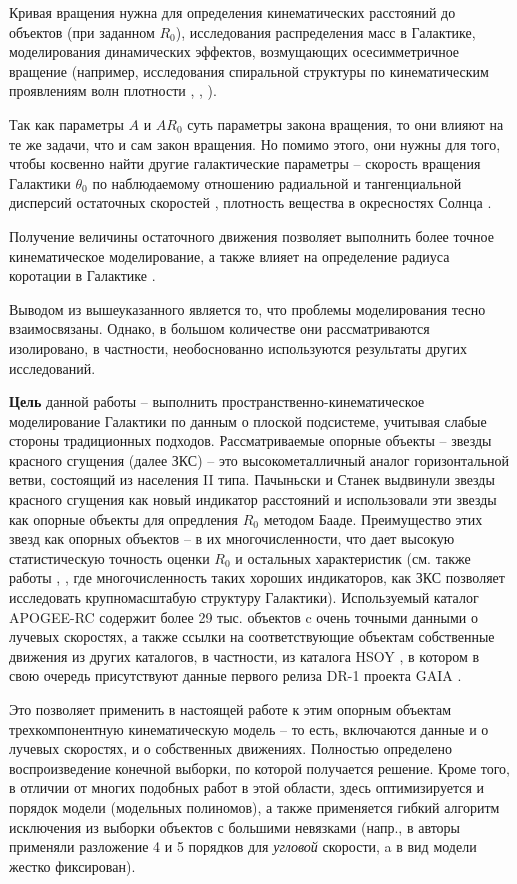 \documentclass{matmex-diploma-custom}
\begin{document}
\par Кривая вращения нужна для определения кинематических расстояний до объектов (при заданном $R_0$), исследования распределения масс в Галактике, моделирования динамических эффектов, возмущающих осесимметричное вращение (например, исследования спиральной структуры по кинематическим проявлениям волн плотности \cite{Sitnik}, \cite{Mishurov}, \cite{NIISch}).
\par Так как параметры $A$ и $AR_0$ суть параметры закона вращения, то они влияют на те же задачи, что и сам закон вращения. Но помимо этого, они нужны для того, чтобы косвенно найти другие галактические параметры -- скорость вращения Галактики $\theta_0$ по наблюдаемому отношению радиальной и тангенциальной дисперсий остаточных скоростей \cite{Rohlfs}, плотность вещества в окресностях Солнца \cite{Lynden-Bell}. 
\par Получение величины остаточного движения позволяет выполнить более точное кинематическое моделирование, а также влияет на определение радиуса коротации в Галактике \cite{Fridman}.
\par Выводом из вышеуказанного является то, что проблемы моделирования тесно взаимосвязаны. Однако, в большом количестве они рассматриваются изолировано, в частности, необоснованно используются результаты других исследований. 
\par \textbf{Цель} данной работы -- выполнить пространственно-кинематическое моделирование Галактики по данным о плоской подсистеме, учитывая слабые стороны традиционных подходов. Рассматриваемые опорные объекты -- звезды красного сгущения (далее ЗКС) -- это высокометалличный аналог горизонтальной ветви, состоящий из населения II типа. Пачыньски и Станек \cite{Paczynski} \cite{Stanek} выдвинули звезды красного сгущения как новый индикатор расстояний и использовали эти звезды как опорные объекты для опредления $R_0$ методом Бааде. Преимущество этих звезд как опорных объектов -- в их многочисленности, что дает высокую статистическую точность оценки $R_0$ и остальных характеристик (см. также работы \cite{Wegg} \cite{Yang}, \cite{Shourya}, где многочисленность таких хороших индикаторов, как ЗКС позволяет исследовать крупномасштабую структуру Галактики). Используемый каталог APOGEE-RC \cite{DRdecs} содержит более 29 тыс. объектов c очень точными данными о лучевых скоростях, а также ссылки на соответствующие объектам собственные движения из других каталогов, в частности, из каталога HSOY \cite{HSOY}, в котором в свою очередь присутствуют данные первого релиза DR-1 проекта GAIA \cite{GAIA}. 
\par Это позволяет применить в настоящей работе к этим опорным объектам трехкомпонентную кинематическую модель -- то есть, включаются данные и о лучевых скоростях, и о собственных движениях. Полностью определено воспроизведение конечной выборки, по которой получается решение. Кроме того, в отличии от многих подобных работ в этой области, здесь оптимизируется и порядок модели (модельных полиномов), а также применяется гибкий алгоритм исключения из выборки объектов с большими невязками (напр., в \cite{Rastorguev} авторы применяли разложение 4 и 5 порядков для \textit{угловой} скорости, a в \cite{Baikbob} вид модели жестко фиксирован).
\end{document}
